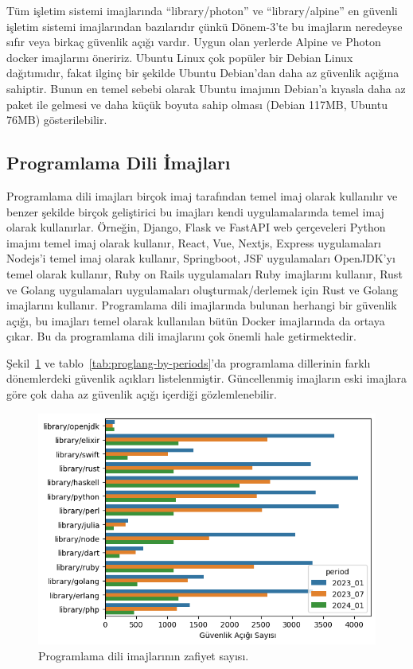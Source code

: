 Tüm işletim sistemi imajlarında ``library/photon'' ve ``library/alpine'' en güvenli işletim sistemi imajlarından bazılarıdır çünkü Dönem-3'te bu imajların neredeyse sıfır veya birkaç güvenlik açığı vardır. Uygun olan yerlerde Alpine ve Photon docker imajlarını öneririz. Ubuntu Linux çok popüler bir Debian Linux dağıtımıdır, fakat ilginç bir şekilde Ubuntu Debian'dan daha az güvenlik açığına sahiptir. Bunun en temel sebebi olarak Ubuntu imajının Debian'a kıyasla daha az paket ile gelmesi ve daha küçük boyuta sahip olması (Debian 117MB, Ubuntu 76MB) gösterilebilir.

\subsection{Programlama Dili İmajları}\label{subsec:prog-lang-images}

Programlama dili imajları birçok imaj tarafından temel imaj olarak kullanılır ve benzer şekilde birçok geliştirici bu imajları kendi uygulamalarında temel imaj olarak kullanırlar. Örneğin, Django, Flask ve FastAPI web çerçeveleri Python imajını temel imaj olarak kullanır, React, Vue, Nextjs, Express uygulamaları Nodejs'i temel imaj olarak kullanır, Springboot, JSF uygulamaları OpenJDK'yı temel olarak kullanır, Ruby on Rails uygulamaları Ruby imajlarını kullanır, Rust ve Golang uygulamaları uygulamaları oluşturmak/derlemek için Rust ve Golang imajlarını kullanır. Programlama dili imajlarında bulunan herhangi bir güvenlik açığı, bu imajları temel olarak kullanılan bütün Docker imajlarında da ortaya çıkar. Bu da programlama dili imajlarını çok önemli hale getirmektedir.

Şekil~\ref{fig:proglang-by-periods} ve tablo~\ref{tab:proglang-by-periods}'da programlama dillerinin farklı dönemlerdeki güvenlik açıkları listelenmiştir. Güncellenmiş imajların eski imajlara göre çok daha az güvenlik açığı içerdiği gözlemlenebilir.

\begin{figure}
    \centering
    \includegraphics[width=1\linewidth]{images/s2/proglang-by-periods.png}
    \caption{Programlama dili imajlarının zafiyet sayısı.}\label{fig:proglang-by-periods}
\end{figure}

